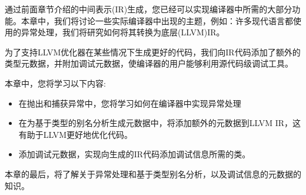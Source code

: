 通过前面章节介绍的中间表示(IR)生成，您已经可以实现编译器中所需的大部分功能。本章中，我们将讨论一些实际编译器中出现的主题，例如：许多现代语言都使用的异常处理，我们将研究如何将其转换为底层(LLVM)IR。\par

为了支持LLVM优化器在某些情况下生成更好的代码，我们向IR代码添加了额外的类型元数据，并附加调试元数据，使编译器的用户能够利用源代码级调试工具。\par

本章中，您将学习以下内容:\par

\begin{itemize}
\item 在抛出和捕获异常中，您将学习如何在编译器中实现异常处理
\item 在为基于类型的别名分析生成元数据中，将添加额外的元数据到LLVM IR，这有助于LLVM更好地优化代码。
\item 添加调试元数据，实现向生成的IR代码添加调试信息所需的类。
\end{itemize}

本章的最后，将了解关于异常处理和基于类型别名分析，以及调试信息的元数据的知识。\par






